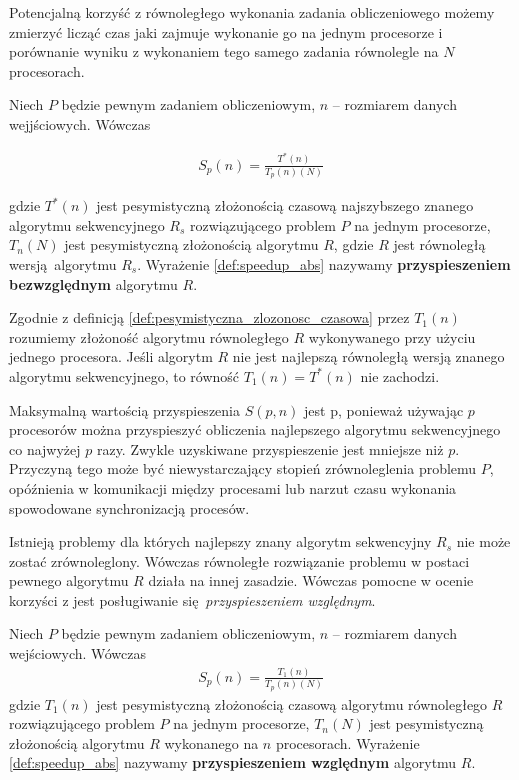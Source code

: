 Potencjalną korzyść z równoległego wykonania zadania obliczeniowego możemy zmierzyć licząć czas jaki zajmuje wykonanie go na jednym procesorze i porównanie wyniku z wykonaniem tego samego zadania równolegle na \(N\) procesorach. 

\begin{definicja}
Niech \(P\) będzie pewnym zadaniem obliczeniowym, \(n\) -- rozmiarem danych wejjściowych. Wówczas

\begin{align}\label{def:speedup_abs}
 S_{p}(n)=\frac{T^{*}(n)}{T_{p}(n)(N)}
\end{align}

gdzie \(T^{*}(n)\) jest pesymistyczną złożonością czasową najszybszego znanego algorytmu sekwencyjnego \(R_s\) rozwiązującego problem \(P\) na jednym procesorze, \(T_{n}(N)\) jest pesymistyczną złożonością algorytmu \(R\), gdzie \(R\) jest równoległą wersją algorytmu \(R_s\). Wyrażenie \ref{def:speedup_abs} nazywamy \textbf{przyspieszeniem bezwzględnym} algorytmu \(R\).
\end{definicja}


Zgodnie z definicją \ref{def:pesymistyczna_zlozonosc_czasowa} przez \(T_{1}(n)\) rozumiemy złożoność algorytmu równoległego \(R\) wykonywanego przy użyciu jednego procesora. Jeśli algorytm \(R\) nie jest najlepszą równoległą wersją znanego algorytmu sekwencyjnego, to równość \(T_{1}(n) = T^{*}(n)\) nie zachodzi.


Maksymalną wartością przyspieszenia \(S(p,n)\) jest p, ponieważ używając \(p\) procesorów można przyspieszyć obliczenia najlepszego algorytmu sekwencyjnego co najwyżej \(p\) razy. Zwykle uzyskiwane przyspieszenie jest mniejsze niż \(p\). Przyczyną tego może być niewystarczający stopień zrównoleglenia problemu \(P\), opóźnienia w komunikacji między procesami lub narzut czasu wykonania spowodowane synchronizacją procesów.


Istnieją problemy dla których najlepszy znany algorytm sekwencyjny \(R_s\) nie może zostać zrównoleglony. Wówczas równoległe rozwiązanie problemu w postaci pewnego algorytmu \(R\) działa na innej zasadzie. Wówczas pomocne w ocenie korzyści z jest posługiwanie się \emph{przyspieszeniem względnym}.

\begin{definicja}
Niech \(P\) będzie pewnym zadaniem obliczeniowym, \(n\) -- rozmiarem danych wejściowych. Wówczas
\begin{align}\label{def:speedup_rel}
 S_{p}(n)=\frac{T_{1}(n)}{T_{p}(n)(N)}
\end{align}
gdzie \(T_{1}(n)\) jest pesymistyczną złożonością czasową algorytmu równoległego \(R\) rozwiązującego problem \(P\) na jednym procesorze, \(T_{n}(N)\) jest pesymistyczną złożonością algorytmu \(R\) wykonanego na \(n\) procesorach. Wyrażenie \ref{def:speedup_abs} nazywamy \textbf{przyspieszeniem względnym} algorytmu \(R\).
\end{definicja}